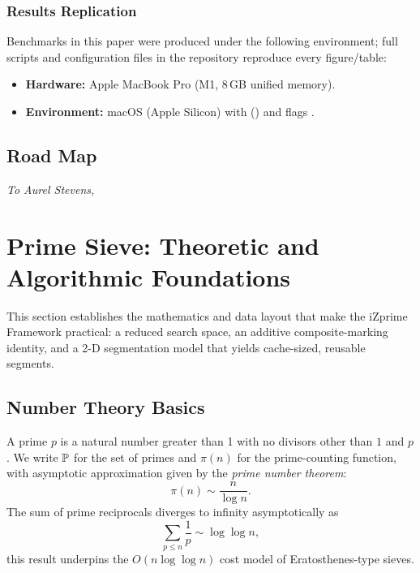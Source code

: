 \documentclass{article}
\begin{document}
\subsubsection{Results Replication}
Benchmarks in this paper were produced under the following environment; full scripts and configuration files in the repository reproduce every figure/table:
\begin{itemize}
    \item \textbf{Hardware:} Apple MacBook Pro (M1, 8\,GB unified memory).
    \item \textbf{Environment:} macOS (Apple Silicon) with  () and flags .
\end{itemize}

\subsection{Road Map}

\vspace*{\fill}
\begin{center}
    \textit{\large{To Aurel Stevens,}}
\end{center}
\newpage


\section{Prime Sieve: Theoretic and Algorithmic Foundations} \label{sec:foundations}

This section establishes the mathematics and data layout that make the iZprime Framework practical: a reduced search space, an additive composite-marking identity, and a 2-D segmentation model that yields cache-sized, reusable segments. 

\subsection{Number Theory Basics}
A prime $p$ is a natural number greater than 1 with no divisors other than $1$ and $p$. 
We write $\mathbb{P}$ for the set of primes and $\pi(n)$ for the prime-counting function, with asymptotic approximation given by the \emph{prime number theorem}:
\begin{equation}
    \label{eq:prime_number_theorem}
    \pi(n) \sim \frac{n}{\log n}.
\end{equation}
The sum of prime reciprocals diverges to infinity asymptotically as
\begin{equation}
    \label{eq:sum_primes}
    \sum_{p \le n} \frac{1}{p} \sim \log \log n,
\end{equation}
this result underpins the $O(n\log\log n)$ cost model of Eratosthenes-type sieves. 
\end{document}
